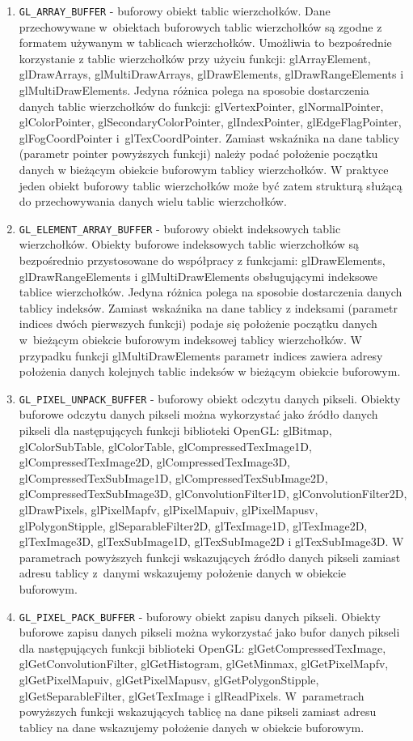 \begin{enumerate}
\item \verb$GL_ARRAY_BUFFER$ - buforowy obiekt tablic wierzchołków. Dane przechowywane w~obiektach buforowych tablic wierzchołków są zgodne z formatem używanym w tablicach wierzchołków. Umożliwia to bezpośrednie korzystanie z tablic wierzchołków przy użyciu funkcji: glArrayElement, glDrawArrays, glMultiDrawArrays, glDrawElements, glDrawRangeElements i glMultiDrawElements. Jedyna różnica polega na sposobie dostarczenia danych tablic wierzchołków do funkcji: glVertexPointer, glNormalPointer, glColorPointer, glSecondaryColorPointer, glIndexPointer, glEdgeFlagPointer, glFogCoordPointer i~glTexCoordPointer. Zamiast wskaźnika na dane tablicy (parametr pointer powyższych funkcji) należy podać położenie początku danych w bieżącym obiekcie buforowym tablicy wierzchołków. W praktyce jeden obiekt buforowy tablic wierzchołków może być zatem strukturą służącą do przechowywania danych wielu tablic wierzchołków.
\item \verb$GL_ELEMENT_ARRAY_BUFFER$ - buforowy obiekt indeksowych tablic wierzchołków. Obiekty buforowe indeksowych tablic wierzchołków są bezpośrednio przystosowane do współpracy z funkcjami: glDrawElements, glDrawRangeElements i glMultiDrawElements obsługującymi indeksowe tablice wierzchołków. Jedyna różnica polega na sposobie dostarczenia danych tablicy indeksów. Zamiast wskaźnika na dane tablicy z indeksami (parametr indices dwóch pierwszych funkcji) podaje się położenie początku danych w~bieżącym obiekcie buforowym indeksowej tablicy wierzchołków. W przypadku funkcji glMultiDrawElements parametr indices zawiera adresy położenia danych kolejnych tablic indeksów w bieżącym obiekcie buforowym.
\item \verb$GL_PIXEL_UNPACK_BUFFER$ - buforowy obiekt odczytu danych pikseli. Obiekty buforowe odczytu danych pikseli można wykorzystać jako źródło danych pikseli dla następujących funkcji biblioteki OpenGL: glBitmap, glColorSubTable, glColorTable, glCompressedTexImage1D, glCompressedTexImage2D, glCompressedTexImage3D, glCompressedTexSubImage1D, glCompressedTexSubImage2D, glCompressedTexSubImage3D, glConvolutionFilter1D, glConvolutionFilter2D, glDrawPixels, glPixelMapfv, glPixelMapuiv, glPixelMapusv, glPolygonStipple, glSeparableFilter2D, glTexImage1D, glTexImage2D, glTexImage3D, glTexSubImage1D, glTexSubImage2D i glTexSubImage3D.
W parametrach powyższych funkcji wskazujących źródło danych pikseli zamiast adresu tablicy z~danymi wskazujemy położenie danych w obiekcie buforowym.
\item \verb$GL_PIXEL_PACK_BUFFER$ - buforowy obiekt zapisu danych pikseli. Obiekty buforowe zapisu danych pikseli można wykorzystać jako bufor danych pikseli dla następujących funkcji biblioteki OpenGL: glGetCompressedTexImage, glGetConvolutionFilter, glGetHistogram, glGetMinmax, glGetPixelMapfv, glGetPixelMapuiv, glGetPixelMapusv, glGetPolygonStipple, glGetSeparableFilter, glGetTexImage i glReadPixels.
W~parametrach powyższych funkcji wskazujących tablicę na dane pikseli zamiast adresu tablicy na dane wskazujemy położenie danych w obiekcie buforowym.
\end{enumerate}
